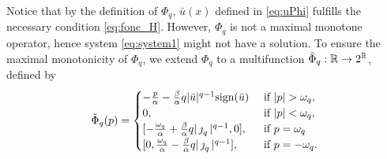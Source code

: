 	
	Notice that by the definition of $\Phi_q$, $\bar u (x)$ defined in \eqref{eq:uPhi} fulfills the necessary condition \eqref{eq:fonc_H}. However, $\Phi_q$ is not a maximal monotone operator, hence system \eqref{eq:system1} might not have a solution.  To ensure the maximal monotonicity of $\Phi_q$, we extend $\Phi_q$ to a multifunction $\tilde \Phi_q:\mathbb{R} \to 2^{\mathbb{R}}$, defined by
	\begin{equation}\label{eq:Phi_ext}
		\tilde\Phi_q (p)  =	
		\begin{cases}
			-\frac{p}{\alpha}-\frac{\beta}{\alpha} q |\bar u|^{q-1}\sign (\bar u) & \text{ if } |p|>\omega_q, \\
			0,                          &	 \text{ if } |p|<\omega_q, \\
			[-\frac{\omega_q}{\alpha}+\frac{\beta}{\alpha} q |\jump_q|^{q-1}, 0] ,                         &	 \text{ if } p=\omega_q\\
			[0,\frac{\omega_q}{\alpha}-\frac{\beta}{\alpha} q |\jump_q|^{q-1}],                         &	 \text{ if } p=-\omega_q.
		\end{cases}
	\end{equation}
	
